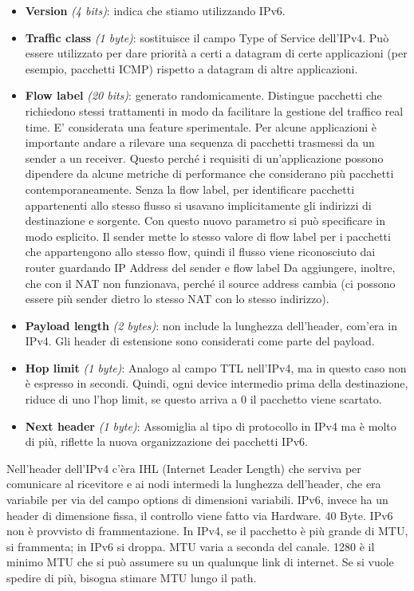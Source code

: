 \documentclass{article}
\begin{document}
\begin{itemize}
    \item \textbf{Version} \textit{(4 bits)}: indica che stiamo utilizzando IPv6.
    \item \textbf{Traffic class} \textit{(1 byte)}: sostituisce il campo Type of Service dell’IPv4. Può essere utilizzato per dare priorità a certi a datagram di certe applicazioni (per esempio, pacchetti ICMP) rispetto a datagram di altre applicazioni.
    \item \textbf{Flow label} \textit{(20 bits)}: generato randomicamente. Distingue pacchetti che richiedono stessi trattamenti in modo da facilitare la gestione del traffico real time. E’ considerata una feature sperimentale. Per alcune applicazioni è importante andare a rilevare una sequenza di pacchetti trasmessi da un sender a un receiver. Questo perché i requisiti di un'applicazione possono dipendere da alcune metriche di performance che considerano più pacchetti contemporaneamente. Senza la flow label, per identificare pacchetti appartenenti allo stesso flusso si usavano implicitamente gli indirizzi di destinazione e sorgente. Con questo nuovo parametro si può specificare in modo esplicito. Il sender mette lo stesso valore di flow label per i pacchetti che appartengono allo stesso flow, quindi il flusso viene riconosciuto dai router guardando IP Address del sender e flow label Da aggiungere, inoltre, che con il NAT non funzionava, perché il source address cambia (ci possono essere più sender dietro lo stesso NAT con lo stesso indirizzo).
    \item \textbf{Payload length} \textit{(2 bytes)}: non include la lunghezza dell’header, com’era in IPv4. Gli header di estensione sono considerati come parte del payload.
    \item \textbf{Hop limit} \textit{(1 byte)}: Analogo al campo TTL nell’IPv4, ma in questo caso non è espresso in secondi. Quindi, ogni device intermedio prima della destinazione, riduce di uno l’hop limit, se questo arriva a 0 il pacchetto viene scartato.
    \item \textbf{Next header} \textit{(1 byte)}: Assomiglia al tipo di protocollo in IPv4 ma è molto di più, riflette la nuova organizzazione dei pacchetti IPv6.
\end{itemize}
Nell’header dell’IPv4 c’èra IHL (Internet Leader Length) che serviva per comunicare al ricevitore e ai nodi intermedi la lunghezza dell’header, che era variabile per via del campo options di dimensioni variabili. IPv6, invece ha un header di dimensione fissa, il controllo viene fatto via Hardware. 40 Byte. IPv6 non è provvisto di frammentazione. In IPv4, se il pacchetto è più grande di MTU, si frammenta; in IPv6 si droppa. MTU varia a seconda del canale. 1280 è il minimo MTU che si può assumere su un qualunque link di internet. Se si vuole spedire di più, bisogna stimare MTU lungo il path. 
\end{document}
